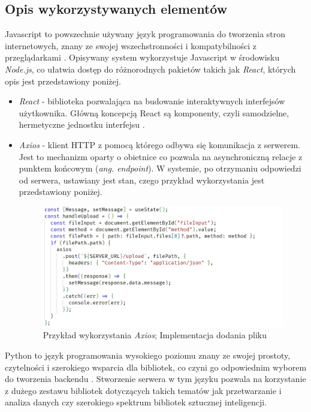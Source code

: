 \documentclass[12pt,a4paper,twoside]{article}
\begin{document}
\subsection{Opis wykorzystywanych elementów}
Javascript to powszechnie używany język programowania do tworzenia stron internetowych, znany ze swojej wszechstronności i kompatybilności z przeglądarkami \cite{javascript}. Opisywany system wykorzystuje Javascript w środowisku \textit{Node.js}, co ułatwia dostęp do różnorodnych pakietów takich jak \textit{React}, których opis jest przedstawiony poniżej.
\begin{itemize}
	\item \textit{React} - biblioteka pozwalająca na budowanie interaktywnych interfejsów użytkownika. Główną koncepcją React są komponenty, czyli samodzielne, hermetyczne jednostku interfejsu \cite{reactjs}.
	\item \textit{Axios} - klient HTTP z pomocą którego odbywa się komunikacja z serwerem. Jest to mechanizm oparty o obietnice co pozwala na asynchroniczną relacje z punktem końcowym (\textit{ang. endpoint}). W systemie, po otrzymaniu odpowiedzi od serwera, ustawiany jest stan, czego przykład wykorzystania jest przedstawiony poniżej.
\begin{figure}[h!]
\centering
\includegraphics[width=\textwidth]{img/axios.jpg}
\caption{Przykład wykorzystania \textit{Axios}; Implementacja dodania pliku}
\end{figure}
\end{itemize}\par
\newpage
Python to język programowania wysokiego poziomu znany ze swojej prostoty, czytelności i szerokiego wsparcia dla bibliotek, co czyni go odpowiednim wyborem do tworzenia backendu \cite{python}. 
Stworzenie serwera w tym języku pozwala na korzystanie z dużego zestawu bibliotek dotyczących takich tematów jak przetwarzanie i analiza danych czy szerokiego spektrum bibliotek sztucznej inteligencji.
\end{document}
